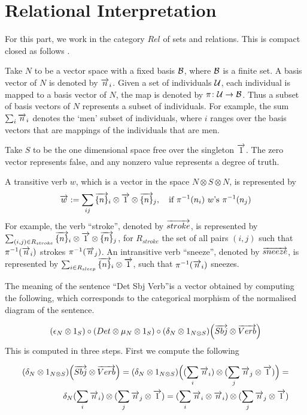 \section{Relational Interpretation}

For this part, we work in the category $Rel$ of sets and relations. This is compact closed as follows \cite{BobEric}. 

Take $N$ to be a vector space with a fixed basis ${\cal B}$, where ${\cal B}$ is a finite set. A  basis vector of $N$  is denoted by $\overrightarrow{n}_i$. Given a set of individuals ${\cal U}$,  each  individual is mapped to a basis vector of $N$, the map is denoted by $\pi \colon {\cal U} \to {\cal B}$.  Thus a subset of basis vectors of $N$ represents a subset of individuals.  For example,    the sum $\sum_i \overrightarrow{n}_i$ denotes the `men' subset of individuals, where $i$ ranges over the basis vectors that are mappings of the individuals that are men. 

Take $S$ to be the one dimensional space free over the singleton $\overrightarrow{1}$. The  zero vector represents false, and any nonzero value represents a degree of truth. 

A transitive verb $w$, which is a vector in the space $N \otimes S
\otimes N$, is represented by 
\[
\overrightarrow{w} := \sum_{ij} \overrightarrow{\{{n}\}}_i \otimes \overrightarrow{1}  \otimes \overrightarrow{\{n\}}_j, \quad 
\text{if} \  \pi^{-1}({n}_i) \ w\mbox{'s} \  \pi^{-1}({n}_j)
\]
 For example, the verb ``stroke'', denoted by $\overrightarrow{stroke}$, is represented by $
\sum_{(i,j) \in  R_{stroke}} \overrightarrow{\{n\}}_i \otimes  \overrightarrow{1}
\otimes \overrightarrow{\{n\}}_j$, for  $R_{stroke}$  the set of all pairs $(i,j)$ such that $\pi^{-1}(\overrightarrow{n}_i)$ strokes $\pi^{-1}(\overrightarrow{n}_j)$.  An intransitive verb ``sneeze'', denoted by $\overrightarrow{sneeze}$, is represented by $\sum_{i \in R_{sleep}} \overrightarrow{\{n\}}_i \otimes \overrightarrow{1}$, such that $\pi^{-1}(\overrightarrow{n}_i)$ sneezes.  


The meaning of the sentence ``Det Sbj Verb''is a vector obtained by computing the following, which corresponds to the categorical morphism of the normalised diagram of the sentence.  

\[
(\epsilon_N \otimes 1_S) \circ (Det \otimes  \mu_N \otimes 1_S) \circ (\delta_N \otimes 1_{N \otimes S})\Big(\overrightarrow{Sbj} \otimes \overrightarrow{Verb}\Big)
\]
This is computed in three steps. First we compute the following

\begin{align*}
(\delta_N \otimes 1_{N \otimes S})\Big(\overrightarrow{Sbj} \otimes \overrightarrow{Verb}\Big) = 
(\delta_N \otimes 1_{N \otimes S})\Big((\sum_i \overrightarrow{n}_i) \otimes (\sum_j \overrightarrow{n}_j  \otimes \overrightarrow{1}) \Big) =\\
\delta_N(\sum_i \overrightarrow{n}_i) \otimes (\sum_j \overrightarrow{n}_j \otimes \overrightarrow{1}) = (\sum_i \overrightarrow{n}_i \otimes \overrightarrow{n}_i) \otimes (\sum_j \overrightarrow{n}_j \otimes \overrightarrow{1})
\end{align*}

